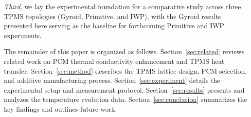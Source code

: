 \emph{Third}, we lay the experimental foundation for a comparative study across three TPMS topologies (Gyroid, Primitive, and IWP), with the Gyroid results presented here serving as the baseline for forthcoming Primitive and IWP experiments.

The remainder of this paper is organized as follows. Section~\ref{sec:related} reviews related work on PCM thermal conductivity enhancement and TPMS heat transfer. Section~\ref{sec:method} describes the TPMS lattice design, PCM selection, and additive manufacturing process. Section~\ref{sec:experiment} details the experimental setup and measurement protocol. Section~\ref{sec:results} presents and analyzes the temperature evolution data. Section~\ref{sec:conclusion} summarizes the key findings and outlines future work.
